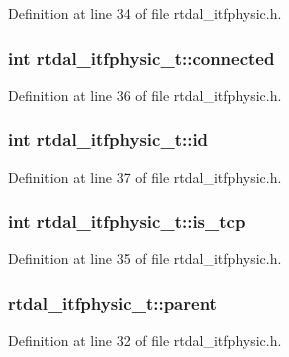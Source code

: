 Definition at line 34 of file rtdal\-\_\-itfphysic.\-h.

\subsubsection[{connected}]{\setlength{\rightskip}{0pt plus 5cm}int rtdal\-\_\-itfphysic\-\_\-t\-::connected}\label{structrtdal__itfphysic__t_a08ddbccdcb13151090301cc74c26c7f6}


Definition at line 36 of file rtdal\-\_\-itfphysic.\-h.

\subsubsection[{id}]{\setlength{\rightskip}{0pt plus 5cm}int rtdal\-\_\-itfphysic\-\_\-t\-::id}\label{structrtdal__itfphysic__t_a970c448897d32b96adb1eba461dda7f6}


Definition at line 37 of file rtdal\-\_\-itfphysic.\-h.

\subsubsection[{is\-\_\-tcp}]{\setlength{\rightskip}{0pt plus 5cm}int rtdal\-\_\-itfphysic\-\_\-t\-::is\-\_\-tcp}\label{structrtdal__itfphysic__t_a515a63500d305554230d7c9abde3d03f}


Definition at line 35 of file rtdal\-\_\-itfphysic.\-h.

\subsubsection[{parent}]{ rtdal\-\_\-itfphysic\-\_\-t\-::parent}\label{structrtdal__itfphysic__t_a070c6f1daf71d41c5871fdb4bd81c124}


Definition at line 32 of file rtdal\-\_\-itfphysic.\-h.



